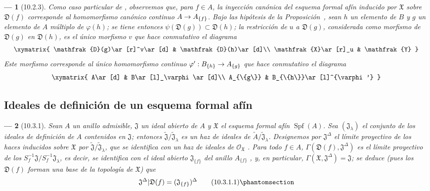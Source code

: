 \documentclass[oneside]{amsart}
\theoremstyle{ega-env-style}
\newtheorem*{env}{---}
\theoremstyle{ega-thm-env-style}
\theoremstyle{ega-defn-env-style}
\renewcommand{\to}{\mathchoice{\longrightarrow}{\rightarrow}{\rightarrow}{\rightarrow}}
\let\EGAOriginalLabel\label
\renewcommand{\label}[1]{\phantomsection\EGAOriginalLabel{#1}}
\begin{document}
\begin{env}[10.2.3]
\label{I.10.2.3}
Como caso particular de , observemos que, para $f\in A$, la inyección canónica del esquema formal afín inducido por $\mathfrak{X}$ sobre $\mathfrak{D}(f)$ corresponde al homomorfismo canónico continuo $A\to A_{\{f\}}$.
Bajo las hipótesis de la Proposición~, sean $h$ un elemento de $B$ y $g$ un elemento de $A$ múltiplo de $\varphi(h)$;
se tiene entonces $\psi(\mathfrak{D}(g))\subset\mathfrak{D}(h)$; la restricción de $u$ a $\mathfrak{D}(g)$, considerada como morfismo de $\mathfrak{D}(g)$ en $\mathfrak{D}(h)$, es el único morfismo $v$ que hace conmutativo el diagrama
\[
  \xymatrix{
    \mathfrak{D}(g)\ar[r]^v\ar[d] &
    \mathfrak{D}(h)\ar[d]\\
    \mathfrak{X}\ar[r]_u &
    \mathfrak{Y}
  }
\]
Este morfismo corresponde al único homomorfismo continuo $\varphi':B_{\{h\}}\to A_{\{g\}}$  que hace conmutativo el diagrama
\[
  \xymatrix{
    A\ar[d] &
    B\ar[l]_\varphi\ar[d]\\
    A_{\{g\}} &
    B_{\{h\}}\ar[l]^{\varphi'}
  }
\]
\end{env}

\subsection{Ideales de definición de un esquema formal afín}
\label{subsection:I.10.3}

\begin{env}[10.3.1]
\label{I.10.3.1}
Sean $A$ un anillo admisible, $\mathfrak{J}$ un ideal abierto de $A$ y $\mathfrak{X}$ el esquema formal afín $\operatorname{Spf}(A)$.
Sea $(\mathfrak{J}_\lambda)$ el conjunto de los ideales de definición de $A$ contenidos en $\mathfrak{J}$; entonces $\widetilde{\mathfrak{J}}/\widetilde{\mathfrak{J}}_\lambda$ es un haz de ideales de $\widetilde{A}/\widetilde{\mathfrak{J}}_\lambda$.
Designemos por $\mathfrak{J}^\Delta$ el límite proyectivo de los haces inducidos sobre $\mathfrak{X}$ por $\widetilde{\mathfrak{J}}/\widetilde{\mathfrak{J}}_\lambda$, que se identifica con un \emph{haz de ideales} de $\mathscr{O}_{\mathfrak{X}}$ .
Para todo $f\in A$, $\Gamma(\mathfrak{D}(f),\mathfrak{J}^\Delta)$ es el límite proyectivo de los $S_f^{-1}\mathfrak{J}/S_f^{-1}\mathfrak{J}_\lambda$, es decir, se identifica con el ideal abierto $\mathfrak{J}_{\{f\}}$ del anillo $A_{\{f\}}$ , y, en particular, $\Gamma(\mathfrak{X},\mathfrak{J}^\Delta)=\mathfrak{J}$; se deduce (pues los $\mathfrak{D}(f)$ forman una base de la topología de $\mathfrak{X}$) que
\[
  \mathfrak{J}^\Delta|\mathfrak{D}(f)
  =(\mathfrak{J}_{\{f\}})^\Delta
  \tag{10.3.1.1}\label{I.10.3.1.1-fr}
\]
\end{env}
\end{document}
